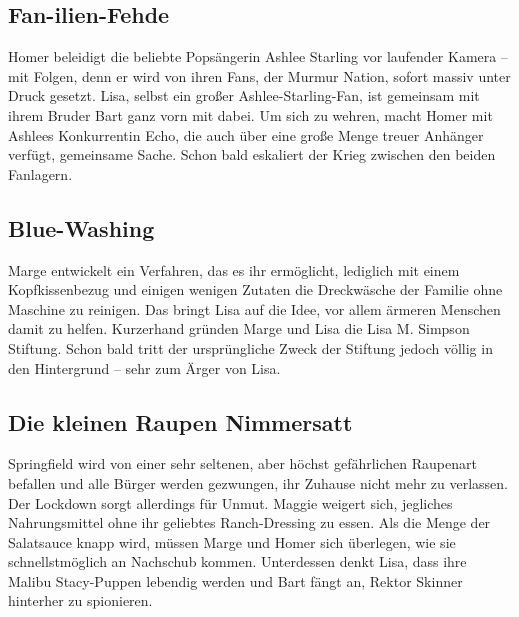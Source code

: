 
\subsection{Fan-ilien-Fehde}
Homer beleidigt die beliebte Popsängerin Ashlee Starling vor laufender Kamera -- mit Folgen, denn er wird von ihren Fans, der Murmur Nation, sofort massiv unter Druck gesetzt. Lisa, selbst ein großer Ashlee-Starling-Fan, ist gemeinsam mit ihrem Bruder Bart ganz vorn mit dabei. Um sich zu wehren, macht Homer mit Ashlees Konkurrentin Echo, die auch über eine große Menge treuer Anhänger verfügt, gemeinsame Sache. Schon bald eskaliert der Krieg zwischen den beiden Fanlagern.

\subsection{Blue-Washing}
Marge entwickelt ein Verfahren, das es ihr ermöglicht, lediglich mit einem Kopfkissenbezug und einigen wenigen Zutaten die Dreckwäsche der Familie ohne Maschine zu reinigen. Das bringt Lisa auf die Idee, vor allem ärmeren Menschen damit zu helfen. Kurzerhand gründen Marge und Lisa die Lisa M. Simpson Stiftung. Schon bald tritt der ursprüngliche Zweck der Stiftung jedoch völlig in den Hintergrund -- sehr zum Ärger von Lisa.


\subsection{Die kleinen Raupen Nimmersatt}\label{OABF14}
Springfield wird von einer sehr seltenen, aber höchst gefährlichen Raupenart befallen und alle Bürger werden gezwungen, ihr Zuhause nicht mehr zu verlassen. Der Lockdown sorgt allerdings für Unmut. Maggie weigert sich, jegliches Nahrungsmittel ohne ihr geliebtes Ranch-Dressing zu essen. Als die Menge der Salatsauce knapp wird, müssen Marge und Homer sich überlegen, wie sie schnellstmöglich an Nachschub kommen. Unterdessen denkt Lisa, dass ihre Malibu Stacy-Puppen lebendig werden und Bart fängt an, Rektor Skinner hinterher zu spionieren.

